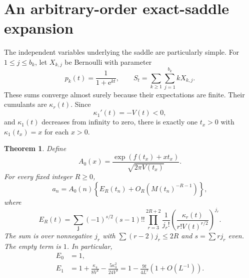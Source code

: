 \documentclass[11pt,letterpaper]{article}
\numberwithin{equation}{section}
\newtheorem{theorem}{Theorem}[section]
\theoremstyle{remark}
\newcommand{\e}{\mathrm e}
\begin{document}
\section{An arbitrary-order exact-saddle expansion}
The independent variables underlying the saddle are particularly simple. For $1\le j\le b_k$, let $X_{k,j}$ be Bernoulli with parameter
\[
 p_k(t)=\frac1{1+\e^{kt}},\qquad S_t=\sum_{k\ge1}\sum_{j=1}^{b_k}kX_{k,j}.
\]
These sums converge almost surely because their expectations are finite. Their cumulants are $\kappa_r(t)$. Since
\[
 \kappa_1'(t)=-V(t)<0,
\]
and $\kappa_1(t)$ decreases from infinity to zero, there is exactly one $t_x>0$ with $\kappa_1(t_x)=x$ for each $x>0$.

\begin{theorem}\label{dwa:sq:thm:exact}
Define
\begin{equation}\label{dwa:sq:eq:A0}
 A_0(x)=\frac{\exp(f(t_x)+xt_x)}{\sqrt{2\pi V(t_x)}}.
\end{equation}
For every fixed integer $R\ge0$,
\begin{equation}\label{dwa:sq:eq:exact-expansion}
 a_n=A_0(n)\left\{E_R(t_n)+O_R(M(t_n)^{-R-1})\right\},
\end{equation}
where
\begin{equation}\label{dwa:sq:eq:ER}
 E_R(t)=\sum_{\boldsymbol j}(-1)^{s/2}(s-1)!!
 \prod_{r=3}^{2R+2}\frac1{j_r!}
 \left(\frac{\kappa_r(t)}{r!V(t)^{r/2}}\right)^{j_r}.
\end{equation}
The sum is over nonnegative $j_r$ with $\sum(r-2)j_r\le2R$ and $s=\sum rj_r$ even. The empty term is $1$. In particular,
\begin{align}
 E_0&=1,\nonumber\\
 E_1&=1+\frac{\kappa_4}{8V^2}-\frac{5\kappa_3^2}{24V^3}
 =1-\frac{9t}{4L^3}\left(1+O(L^{-1})\right).\label{dwa:sq:eq:E1}
\end{align}
\end{theorem}
\end{document}

